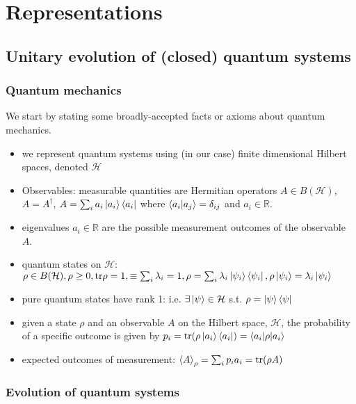 \documentclass[10pt,oneside,longbibliography]{report}
\begin{document}
\chapter{Representations}
\section{Unitary evolution of (closed) quantum systems}
\subsection{Quantum mechanics}
We start by stating some broadly-accepted facts or axioms about quantum mechanics.
\begin{itemize}
    \item we represent quantum systems using (in our case) finite dimensional Hilbert spaces, denoted $\mathcal{H}$
    \item Observables: measurable quantities are Hermitian operators $A\in B(\mathcal{H})$, $A=A^{\dagger}$, $A=\sum_i a_i \ket{a_i}\bra{a_i}$ where $\braket{a_i|a_j}=\delta_{ij}$ and $a_i \in \mathbb{R}$.
    \item eigenvalues $a_i \in \mathbb{R}$ are the possible measurement outcomes of the observable $A$.
    \item quantum states on $\mathcal{H}$: $\rho \in B(\mathcal{H}), \rho \geq 0, \text{tr}\rho =1, \equiv \sum_i \lambda_i =1, \rho=\sum_i \lambda_i \ket{\psi_i}\bra{\psi_i}, \rho\ket{\psi_i}=\lambda_i \ket{\psi_i}$
    \item pure quantum states have rank 1: i.e. $\exists \ket{\psi}\in \mathcal{H}$ s.t. $\rho = \ket{\psi}\bra{\psi}$
    \item given a state $\rho$ and an observable $A$ on the Hilbert space, $\mathcal{H}$, the probability of a specific outcome is given by $p_i = \text{tr}(\rho \ket{a_i}\bra{a_i})=\braket{a_i|\rho |a_i}$
    \item expected outcomes of measurement: $\braket{A}_{\rho}=\sum_i p_i a_i =\text{tr}(\rho A)$
\end{itemize}

\subsection{Evolution of quantum systems}
\end{document}
